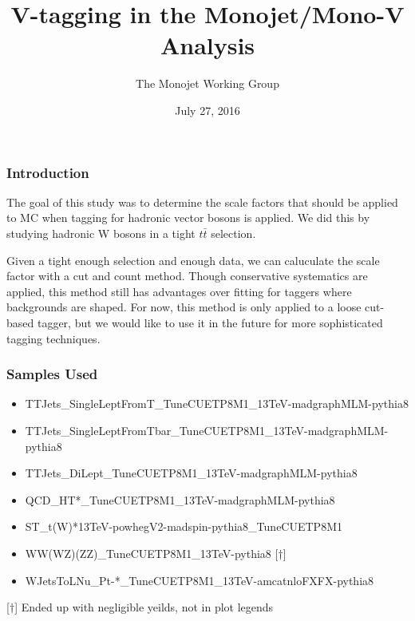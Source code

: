 \documentclass{beamer}
\author[D. Abercrombie]{
  The Monojet Working Group
}
\title{\bf \sffamily V-tagging in the Monojet/Mono-V Analysis}
\date{July 27, 2016}
\begin{document}
\begin{frame}[nonumbering]
  \titlepage
\end{frame}

\begin{frame}
  \frametitle{Introduction}
  The goal of this study was to determine the scale factors that should
  be applied to MC when tagging for hadronic vector bosons is applied.
  We did this by studying hadronic W bosons in a tight $t\bar{t}$ selection.

  \vspace{12pt}

  Given a tight enough selection and enough data, we can caluculate the 
  scale factor with a cut and count method.
  Though conservative systematics are applied, this method still has advantages
  over fitting for taggers where backgrounds are shaped.
  For now, this method is only applied to a loose cut-based tagger,
  but we would like to use it in the future for more sophisticated tagging techniques.
\end{frame}

\begin{frame}
  \frametitle{Samples Used}
  \begin{itemize}
  \item TTJets\_SingleLeptFromT\_TuneCUETP8M1\_13TeV-madgraphMLM-pythia8
  \item TTJets\_SingleLeptFromTbar\_TuneCUETP8M1\_13TeV-madgraphMLM-pythia8
  \item TTJets\_DiLept\_TuneCUETP8M1\_13TeV-madgraphMLM-pythia8
  \item QCD\_HT*\_TuneCUETP8M1\_13TeV-madgraphMLM-pythia8
  \item ST\_t(W)*13TeV-powhegV2-madspin-pythia8\_TuneCUETP8M1
  \item WW(WZ)(ZZ)\_TuneCUETP8M1\_13TeV-pythia8 [$\dagger$]
  \item WJetsToLNu\_Pt-*\_TuneCUETP8M1\_13TeV-amcatnloFXFX-pythia8
  \end{itemize}
  [$\dagger$] Ended up with negligible yeilds, not in plot legends
\end{frame}
\end{document}
